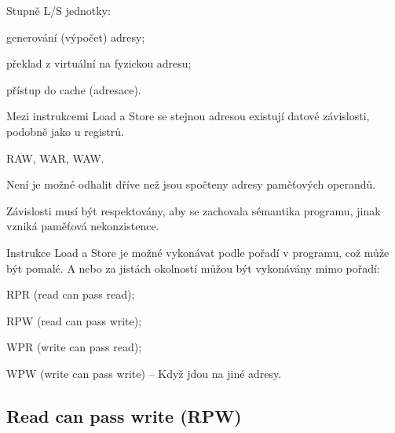 \begin{compactitem}
    \item Stupně L/S jednotky: \begin{compactitem}
        \item generování (výpočet) adresy;
        \item překlad z virtuální na fyzickou adresu;
        \item přístup do cache (adresace).
    \end{compactitem}

    \item Mezi instrukcemi Load a Store se stejnou adresou existují datové závislosti, podobně jako u registrů. \begin{compactitem}
        \item RAW, WAR, WAW.
        \item Není je možné odhalit dříve než jsou spočteny adresy paměťových operandů.
        \item Závislosti musí být respektovány, aby se zachovala sémantika programu, jinak vzniká paměťová nekonzistence.
    \end{compactitem}

    \item Instrukce Load a Store je možné vykonávat podle pořadí v programu, což může být pomalé. A nebo za jistách okolností můžou být vykonávány mimo pořadí: \begin{compactitem}
        \item RPR (read can pass read);
        \item RPW (read can pass write);
        \item WPR (write can pass read);
        \item WPW (write can pass write) -- Když jdou na jiné adresy.
    \end{compactitem}
\end{compactitem}

\subsection{Read can pass write (RPW)}

